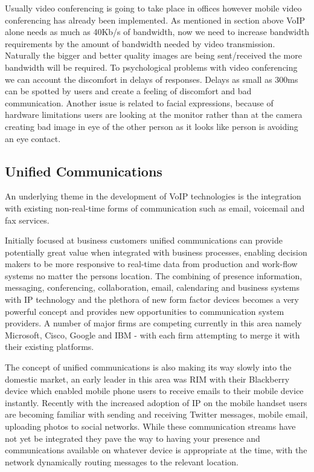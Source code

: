 Usually video conferencing is going to take place in offices however mobile video conferencing has already been implemented. As mentioned in section above VoIP alone needs as much as 40Kb/s of bandwidth, now we need to increase bandwidth requirements by the amount of bandwidth needed by video transmission. Naturally the bigger and better quality images are being sent/received the more bandwidth will be required. 
To psychological problems with video conferencing we can account the discomfort in delays of responses. Delays as small as 300ms can be spotted by users and create a feeling of discomfort and bad communication. Another issue is related to facial expressions, because of hardware limitations users are looking at the monitor rather than at the camera creating bad image in eye of the other person as it looks like person is avoiding an eye contact\cite{website:vid_conf_overview}.

\subsection{Unified Communications}

An underlying theme in the development of VoIP technologies is the integration with existing non-real-time forms of communication such as email, voicemail and fax services.

Initially focused at business customers unified communications can provide potentially great value when integrated with business processes, enabling decision makers to be more responsive to real-time data from production and work-flow systems no matter the persons location. The combining of presence information, messaging, conferencing, collaboration, email, calendaring and business systems with IP technology and the plethora of new form factor devices becomes a very powerful concept and provides new opportunities to communication system providers. A number of major firms are competing currently in this area namely Microsoft, Cisco, Google and IBM - with each firm attempting to merge it with their existing platforms.

The concept of unified communications is also making its way slowly into the domestic market, an early leader in this area was RIM with their Blackberry device which enabled mobile phone users to receive emails to their mobile device instantly. Recently with the increased adoption of IP on the mobile handset users are becoming familiar with sending and receiving Twitter messages, mobile email, uploading photos to social networks. While these communication streams have not yet be integrated they pave the way to having your presence and communications available on whatever device is appropriate at the time, with the network dynamically routing messages to the relevant location.


